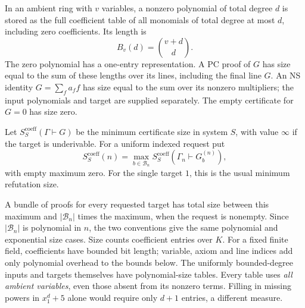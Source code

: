 \begin{definition}\label{def:dense-size}
In an ambient ring with $v$ variables, a nonzero polynomial of total
degree $d$ is stored as the full coefficient table of all monomials of
total degree at most $d$, including zero coefficients. Its length is
\[
                       B_v(d)=\binom{v+d}{d}.
\]
The zero polynomial has a one-entry representation. A PC proof of $G$
has size equal to the sum of these lengths over its lines, including
the final line $G$. An NS identity $G=\sum_fa_ff$ has size equal to
the sum over its nonzero multipliers; the input polynomials and target
are supplied separately. The empty certificate for $G=0$ has size zero.

Let $S^{\mathrm{coeff}}_S(\Gamma\vdash G)$ be the minimum certificate
size in system $S$, with value $\infty$ if the target is underivable.
For a uniform indexed request put
\[
 S^{\mathrm{coeff}}_S(n)=\max_{b\in\mathcal B_n}
                   S^{\mathrm{coeff}}_S(\Gamma_n\vdash G_b^{(n)}),
\]
with empty maximum zero. For the single target $1$, this is the usual
minimum refutation size.
\end{definition}

A bundle of proofs for every requested target has total size between
this maximum and $|\mathcal B_n|$ times the maximum, when the request
is nonempty. Since $|\mathcal B_n|$ is polynomial in $n$, the two
conventions give the same polynomial and exponential size cases.
Size counts coefficient entries over $K$. For a fixed finite field,
coefficients have bounded bit length; variable, axiom and line indices
add only polynomial overhead to the bounds below. The uniformly
bounded-degree inputs and targets themselves have polynomial-size
tables. Every table uses \emph{all ambient variables}, even those
absent from its nonzero terms. Filling in missing powers in
$x_1^d+5$ alone would require only $d+1$ entries, a different measure.

